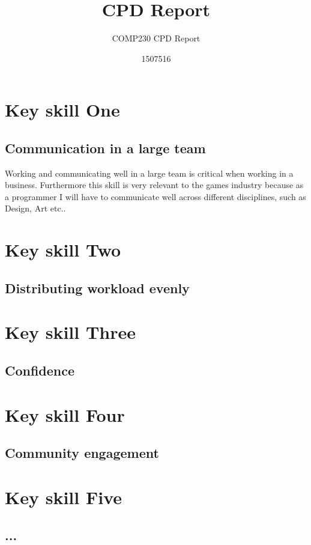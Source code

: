 \documentclass{scrartcl}
\title{CPD Report}
\subtitle{COMP230 CPD Report}
\author{1507516}
\begin{document}
\maketitle






\section{Key skill One}
\subsection{Communication in a large team}

Working and communicating well in a large team is critical when working in a business. Furthermore this skill is very relevant to the games industry because as a programmer I will have to communicate well across different disciplines, such as Design, Art etc..



\section{Key skill Two}
\subsection{Distributing workload evenly}


\section{Key skill Three}
\subsection{Confidence}

\section{Key skill Four}
\subsection{Community engagement}


\section{Key skill Five}
\subsection{...}
\end{document}

